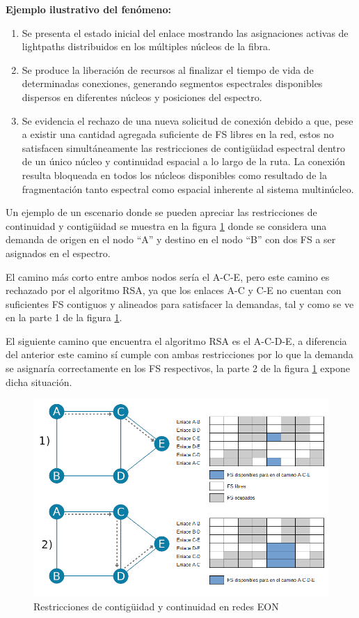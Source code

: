 \textbf{Ejemplo ilustrativo del fenómeno:}
\begin{enumerate}[1 -]
   \item Se presenta el estado inicial del enlace mostrando las asignaciones activas de lightpaths distribuidos en los múltiples núcleos de la fibra.
   \item Se produce la liberación de recursos al finalizar el tiempo de vida de determinadas conexiones, generando segmentos espectrales disponibles dispersos en diferentes núcleos y posiciones del espectro.
   \item Se evidencia el rechazo de una nueva solicitud de conexión debido a que, pese a existir una cantidad agregada suficiente de FS libres en la red, estos no satisfacen simultáneamente las restricciones de contigüidad espectral dentro de un único núcleo y continuidad espacial a lo largo de la ruta. La conexión resulta bloqueada en todos los núcleos disponibles como resultado de la fragmentación tanto espectral como espacial inherente al sistema multinúcleo.  
\end{enumerate}
%

Un ejemplo de un escenario donde se pueden apreciar las restricciones de continuidad y contigüidad se muestra en la figura \ref{fig:fragmentacion} donde se considera una demanda de origen en el nodo ``A'' y destino en el nodo ``B'' con dos FS a ser asignados en el espectro.

El camino más corto entre ambos nodos sería el A-C-E, pero este camino es rechazado por el algoritmo RSA, ya que los enlaces A-C y C-E no cuentan con suficientes FS contiguos y alineados para satisfacer la demandas, tal y como se ve en la parte 1 de la figura \ref{fig:fragmentacion}.

El siguiente camino que encuentra el algoritmo RSA es el A-C-D-E, a diferencia del anterior este camino sí cumple con ambas restricciones por lo que la demanda se asignaría correctamente en los FS respectivos, la parte 2 de la figura \ref{fig:fragmentacion} expone dicha situación.
\begin{figure}
    \centering
    \includegraphics[width=1\textwidth]{capitulos/img/fragmentacion.png}
    \caption{Restricciones de contigüidad y continuidad en redes EON}
    \label{fig:fragmentacion}
\end{figure}

